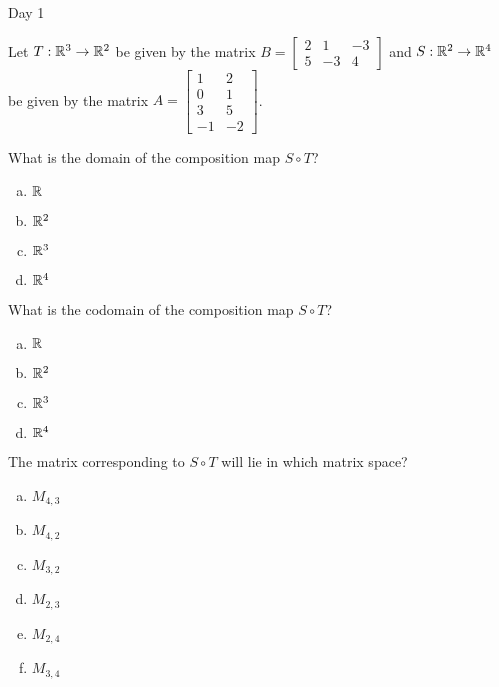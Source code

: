 
\begin{applicationActivities}{Day 1}

\begin{activity}{0}
Let $T: \mathbb{R}^3 \rightarrow \mathbb{R}^2$ be given by the matrix $B=\begin{bmatrix} 2 & 1 & -3 \\ 5 & -3 & 4 \end{bmatrix}$ and $S: \mathbb{R}^2 \rightarrow \mathbb{R}^4$ be given by the matrix $A=\begin{bmatrix} 1 & 2 \\ 0 & 1 \\ 3 & 5 \\ -1 & -2 \end{bmatrix}$.

What is the domain of the composition map $S \circ T$?
\begin{enumerate}[(a)]
\item $\mathbb{R}$
\item $\mathbb{R}^2$
\item $\mathbb{R}^3$
\item $\mathbb{R}^4$
\end{enumerate}
\end{activity}

\begin{activity}{0}
What is the codomain of the composition map $S \circ T$?
\begin{enumerate}[(a)]
\item $\mathbb{R}$
\item $\mathbb{R}^2$
\item $\mathbb{R}^3$
\item $\mathbb{R}^4$
\end{enumerate}
\end{activity}

\begin{activity}{0}
The matrix corresponding to $S \circ T$ will lie in which matrix space?
\begin{enumerate}[(a)]
\item $M_{4,3}$
\item $M_{4,2}$
\item $M_{3,2}$
\item $M_{2,3}$
\item $M_{2,4}$
\item $M_{3,4}$
\end{enumerate}
\end{activity}


\end{applicationActivities}
